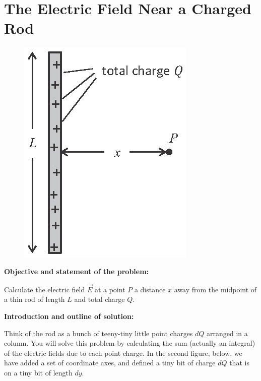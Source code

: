 \section{The Electric Field Near a Charged Rod}


\makelabheader %

\begin{figure}
\vspace{-.25in}
\hspace{0.13in}\includegraphics{electric_field_near_a_charged_rod/fig1.eps}
\end{figure}

\vspace{1cm}

\textbf{Objective and statement of the problem:}

Calculate the electric field $\vec{E}$ at a point $P$ a distance $x$ away from the midpoint of a thin rod
of length $L$ and total charge $Q$.

\vspace{1cm}

\textbf{Introduction and outline of solution:}

Think of the rod as a bunch of teeny-tiny little point charges $dQ$ arranged in a column. You will solve this problem by calculating the sum (actually an integral) of the electric fields due to each point charge.  In the second figure, below, we have added a set of coordinate axes, and defined a tiny bit of charge $dQ$ that is on a tiny bit of length $dy$.  
\par

